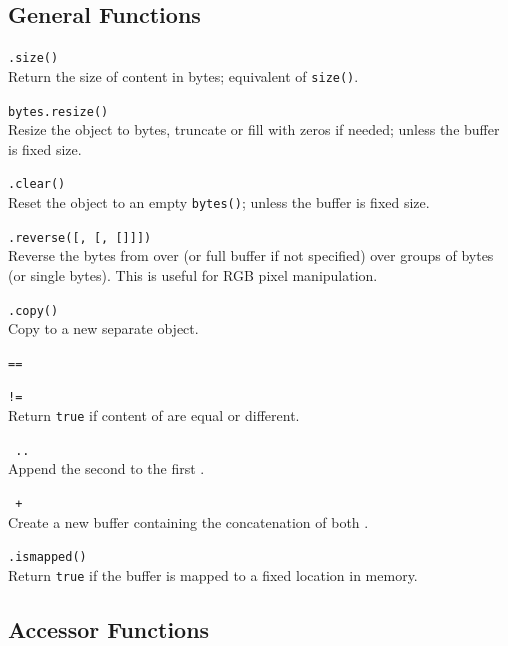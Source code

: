 \subsection*{General Functions}

\hangpar {}\texttt{.size()}\\
Return the size of content in bytes; equivalent of \texttt{size(}\texttt{)}.

\hangpar \texttt{bytes.resize(}\texttt{)} \\
Resize the object to  bytes, truncate or fill with zeros if needed; unless the buffer is fixed size.

\hangpar {}\texttt{.clear()}\\
Reset the object to an empty \texttt{bytes()}; unless the buffer is fixed size.

\hangpar {}\texttt{.reverse([}\texttt{, [}\texttt{, [}\texttt{]]])}\\
Reverse the bytes from  over  (or full buffer if not specified) over groups of  bytes (or single bytes). This is useful for RGB pixel manipulation.

\hangpar {}\texttt{.copy()}\\
Copy to a new separate object.

\hangpar {}\texttt{==}

\hangpar {}\texttt{!=}\\
Return \texttt{true} if content of  are equal or different.

\hangpar {}\texttt{ .. }\\
Append the second  to the first .

\hangpar {}\texttt{ + }\\
Create a new  buffer containing the concatenation of both .

\hangpar {}\texttt{.ismapped()}\\
Return \texttt{true} if the buffer is mapped to a fixed location in memory.

\subsection*{Accessor Functions}

